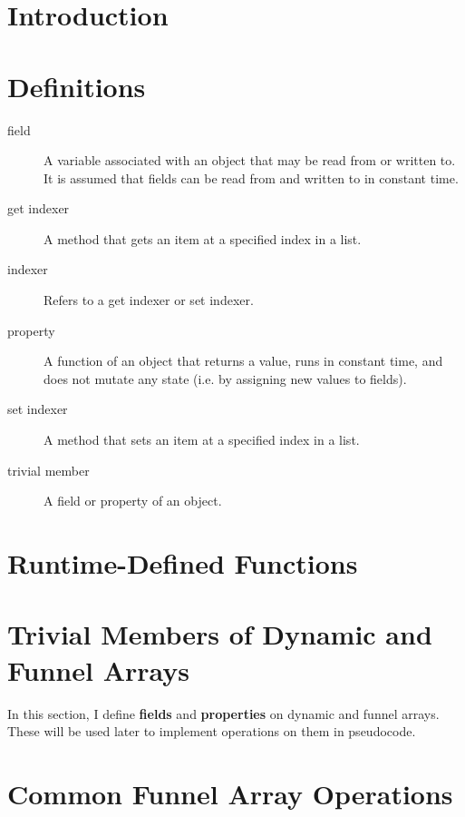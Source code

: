 \documentclass{article}
\begin{document}
	\begin{abstract}
	\end{abstract}

	\section{Introduction}

	\section{Definitions}
	
	\begin{description}
		\item[field] A variable associated with an object that may be read from or written to.\\
			It is assumed that fields can be read from and written to in constant time.
		\item[get indexer] A method that gets an item at a specified index in a list.
		\item[indexer] Refers to a get indexer or set indexer.
		\item[property] A function of an object that returns a value, runs in constant time, and does not mutate any state (i.e. by assigning new values to fields).
		\item[set indexer] A method that sets an item at a specified index in a list.
		\item[trivial member] A field or property of an object.
	\end{description}

	\section{Runtime-Defined Functions}
	
	\section{Trivial Members of Dynamic and Funnel Arrays}
	
	In this section, I define \textbf{fields} and \textbf{properties} on dynamic and funnel arrays. These will be used later to implement operations on them in pseudocode.
	
	\section{Common Funnel Array Operations}
	
\end{document}
